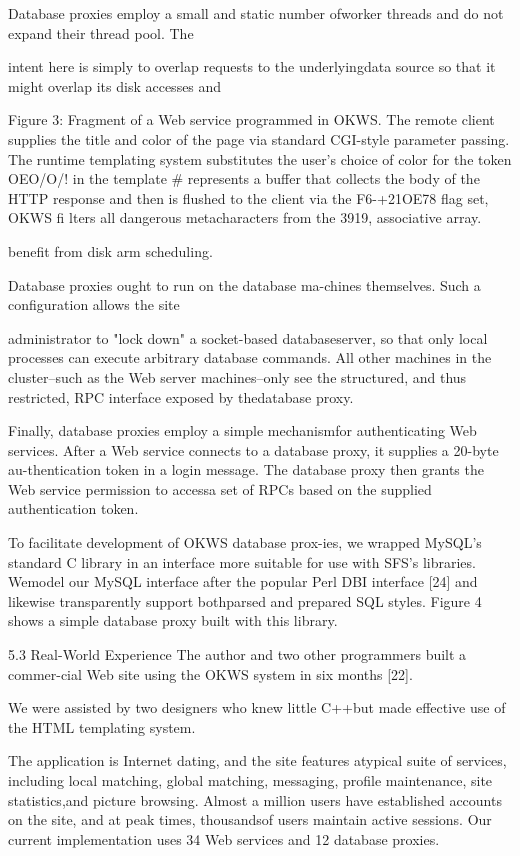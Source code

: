 Database proxies employ a small and static number ofworker threads and do not expand their thread pool. The

intent here is simply to overlap requests to the underlyingdata source so that it might overlap its disk accesses and

Figure 3: Fragment of a Web service programmed in OKWS.
The remote client supplies the title and color of the page via
standard CGI-style parameter passing. The runtime templating
system substitutes the user's choice of color for the token OEO/O/!
in the template #%
represents a buffer that collects the body of the HTTP response and then is flushed to the client via %
the F6-+21OE78 flag set, OKWS fi lters all dangerous metacharacters from the 3919, associative array.

benefit from disk arm scheduling.

Database proxies ought to run on the database ma-chines themselves. Such a configuration allows the site

administrator to "lock down" a socket-based databaseserver, so that only local processes can execute arbitrary
database commands. All other machines in the cluster--such as the Web server machines--only see the structured, and thus restricted, RPC interface exposed by thedatabase proxy.

Finally, database proxies employ a simple mechanismfor authenticating Web services. After a Web service
connects to a database proxy, it supplies a 20-byte au-thentication token in a login message. The database
proxy then grants the Web service permission to accessa set of RPCs based on the supplied authentication token.

To facilitate development of OKWS database prox-ies, we wrapped MySQL's standard C library in an interface more suitable for use with SFS's libraries. Wemodel our MySQL interface after the popular Perl DBI
interface [24] and likewise transparently support bothparsed and prepared SQL styles. Figure 4 shows a simple
database proxy built with this library.

5.3 Real-World Experience
The author and two other programmers built a commer-cial Web site using the OKWS system in six months [22].

We were assisted by two designers who knew little C++but made effective use of the HTML templating system.

The application is Internet dating, and the site features atypical suite of services, including local matching, global
matching, messaging, profile maintenance, site statistics,and picture browsing. Almost a million users have established accounts on the site, and at peak times, thousandsof users maintain active sessions. Our current implementation uses 34 Web services and 12 database proxies.

